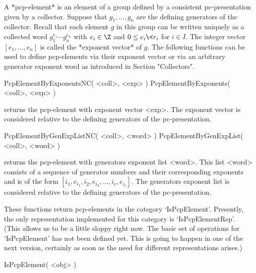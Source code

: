 


A *pcp-element* is an element of a group defined by a consistent
pc-presentation given by a collector. Suppose that $g_1, \ldots, g_n$
are the defining generators of the collector. Recall that each element
$g$ in this group can be written uniquely as a collected word $g_1^{e_1}
\cdots g_n^{e_n}$ with $e_i \in \Z$ and $0 \leq e_i \< r_i$ for $i \in
I$. The integer vector $[e_1, \ldots, e_n]$ is called the *exponent
vector* of $g$.  The following functions can be used to define
pcp-elements via their exponent vector or via an arbitrary generator
exponent word as introduced in Section "Collectors".

\>PcpElementByExponentsNC( <coll>, <exp> )
\>PcpElementByExponents( <coll>, <exp> )

returns the pcp-element with exponent vector <exp>. The exponent vector
is considered relative to the defining generators of the pc-presentation.

\>PcpElementByGenExpListNC( <coll>, <word> )
\>PcpElementByGenExpList( <coll>, <word> )

returns the pcp-element with generators exponent list <word>. This list
<word> consists of a sequence of generator numbers and their corresponding
exponents and is of the form $[i_1, e_{i_1}, i_2, e_{i_2}, \ldots, i_r, 
e_{i_r}]$. The 
generators exponent list is considered relative to the defining generators
of the pc-presentation. 

These functions return pcp-elements in the category `IsPcpElement'.
Presently,  the  only representation  implemented for this category
is `IsPcpElementRep'.  
(This allows us  to be a  little sloppy right now.  The basic  set of 
operations for  `IsPcpElement' has  not been defined yet.  This is 
going to happen in one of the next version, certainly as soon as the 
need for different representations arises.)

\>IsPcpElement( <obj> )

